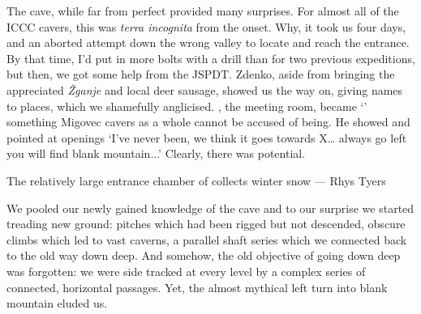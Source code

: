 The cave, while far from perfect provided many surprises. For almost all of the ICCC cavers, this was \textsl{terra incognita}  from the onset. Why, it took us four days, and an aborted attempt down the wrong valley to locate and reach the entrance. By that time, I'd put in more bolts with a drill than for two previous expeditions, but then, we got some help from the JSPDT. Zdenko, aside from bringing the appreciated \emph{\v{Z}ganje}  and local deer sausage, showed us the way on, giving names to places, which we shamefully anglicised. , the meeting room, became `' something Migovec cavers as a whole cannot be accused of being. He showed and pointed at openings `I've never been, we think it goes towards X… always go left you will find blank mountain...' Clearly, there was potential.


\begin{marginfigure}

	\checkoddpage \ifoddpage \forcerectofloat \else \forceversofloat \fi
	\centering
  	\caption{The relatively large entrance chamber of \protect{} collects winter snow --- Rhys Tyers}
	\end{marginfigure}

We pooled our newly gained knowledge of the cave and to our surprise we started treading new ground: pitches which had been rigged but not descended, obscure climbs which led to vast caverns, a parallel shaft series which we connected back to the old way down deep. And somehow, the old objective of going down deep was forgotten: we were side tracked at every level by a complex series of connected, horizontal passages. Yet, the almost mythical left turn into blank mountain eluded us.

